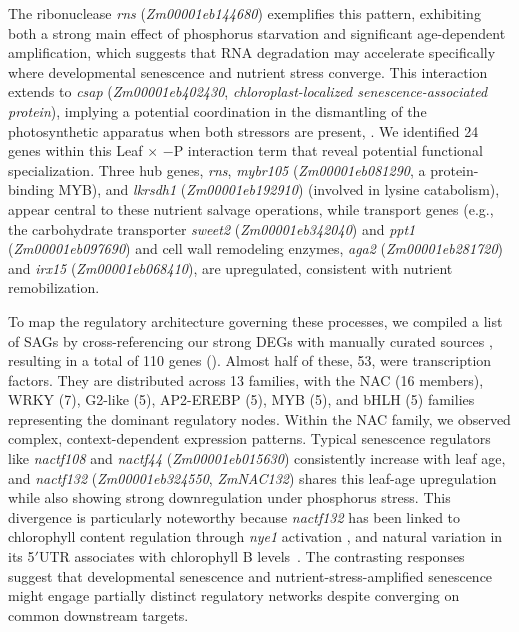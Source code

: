 \documentclass[9pt,twocolumn,twoside]{rilabRxiv}
\begin{document}
The ribonuclease \textit{rns} (\textit{Zm00001eb144680}) exemplifies this pattern, exhibiting both a strong main effect of phosphorus starvation and significant age-dependent amplification, which suggests that RNA degradation may accelerate specifically where developmental senescence and nutrient stress converge. 
This interaction extends to \textit{csap} (\textit{Zm00001eb402430}, \textit{chloroplast-localized senescence-associated protein}), implying a potential coordination in the dismantling of the photosynthetic apparatus when both stressors are present, \cite{so2020}. 
We identified 24 genes within this Leaf $\times$ $-$P interaction term that reveal potential functional specialization. 
Three hub genes, \textit{rns}, \textit{mybr105} (\textit{Zm00001eb081290}, a protein-binding MYB), and \textit{lkrsdh1} (\textit{Zm00001eb192910}) (involved in lysine catabolism), appear central to these nutrient salvage operations, while transport genes (e.g., the carbohydrate transporter \textit{sweet2} (\textit{Zm00001eb342040}) and \textit{ppt1} (\textit{Zm00001eb097690}) and cell wall remodeling enzymes, \textit{aga2} (\textit{Zm00001eb281720}) and \textit{irx15} (\textit{Zm00001eb068410}),  are upregulated, consistent with nutrient remobilization.

To map the regulatory architecture governing these processes, we compiled a list of SAGs by cross-referencing our strong DEGs with manually curated sources \cite{zhang2014c,liu2011,ojedarivera2026,berardini2015,durinck2005}, resulting in a total of 110 genes (). 
Almost half of these, 53, were transcription factors. 
They are distributed across 13 families, with the NAC (16 members), WRKY (7), G2-like (5), AP2-EREBP (5), MYB (5), and bHLH (5) families representing the dominant regulatory nodes. 
Within the NAC family, we observed complex, context-dependent expression patterns. 
Typical senescence regulators like \textit{nactf108} and \textit{nactf44} (\textit{Zm00001eb015630}) consistently increase with leaf age, and \textit{nactf132} (\textit{Zm00001eb324550}, \textit{ZmNAC132}) shares this leaf-age upregulation while also showing strong downregulation under phosphorus stress.
This divergence is particularly noteworthy because \textit{nactf132} has been linked to chlorophyll content regulation through \textit{nye1} activation \cite{yuan2023}, and natural variation in its 5$'$UTR associates with chlorophyll B levels~\cite{wallace2014a}. 
The contrasting responses suggest that developmental senescence and nutrient-stress-amplified senescence might engage partially distinct regulatory networks despite converging on common downstream targets.
\end{document}
